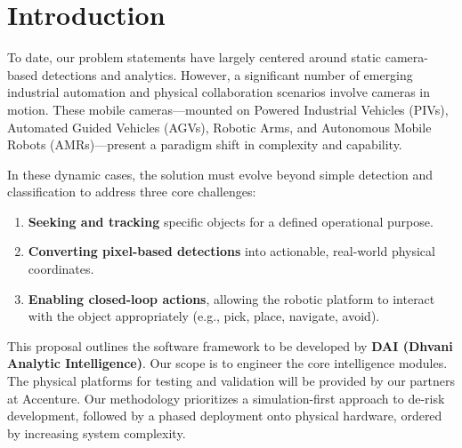 \chapter{Introduction}
\label{chap:introduction}

To date, our problem statements have largely centered around static camera-based detections and analytics. However, a significant number of emerging industrial automation and physical collaboration scenarios involve cameras in motion. These mobile cameras—mounted on Powered Industrial Vehicles (PIVs), Automated Guided Vehicles (AGVs), Robotic Arms, and Autonomous Mobile Robots (AMRs)—present a paradigm shift in complexity and capability.

In these dynamic cases, the solution must evolve beyond simple detection and classification to address three core challenges:
\begin{enumerate}
    \item \textbf{Seeking and tracking} specific objects for a defined operational purpose.
    \item \textbf{Converting pixel-based detections} into actionable, real-world physical coordinates.
    \item \textbf{Enabling closed-loop actions}, allowing the robotic platform to interact with the object appropriately (e.g., pick, place, navigate, avoid).
\end{enumerate}

This proposal outlines the software framework to be developed by \textbf{DAI (Dhvani Analytic Intelligence)}. Our scope is to engineer the core intelligence modules. The physical platforms for testing and validation will be provided by our partners at Accenture. Our methodology prioritizes a simulation-first approach to de-risk development, followed by a phased deployment onto physical hardware, ordered by increasing system complexity.